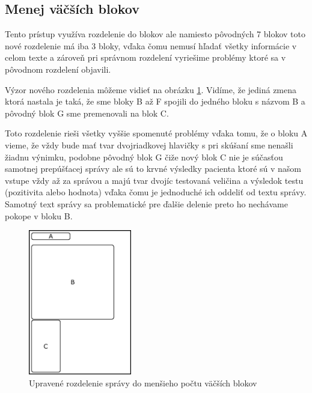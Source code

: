 \subsection{Menej väčších blokov}

Tento prístup využíva rozdelenie do blokov ale namiesto pôvodných 7 blokov toto nové rozdelenie má iba 3 bloky, vďaka čomu nemusí hľadať všetky informácie v celom texte a zároveň pri správnom rozdelení vyriešime problémy ktoré sa v pôvodnom rozdelení objavili. 

Výzor nového rozdelenia môžeme vidieť na obrázku \ref{obr:sprava_uprava}. Vidíme, že jediná zmena ktorá nastala je taká, že sme bloky B až F spojili do jedného bloku s názvom B a pôvodný blok G sme premenovali na blok C. 

Toto rozdelenie rieši všetky vyššie spomenuté problémy vďaka tomu, že o bloku A vieme, že vždy bude mať tvar dvojriadkovej hlavičky s pri skúšaní sme nenašli žiadnu výnimku, podobne pôvodný blok G čiže nový blok C nie je súčasťou samotnej prepúšťacej správy ale sú to krvné výsledky pacienta ktoré sú v našom vstupe vždy až za správou a majú tvar dvojíc testovaná veličina a výsledok testu (pozitivita alebo hodnota) vďaka čomu je jednoduché ich oddeliť od textu správy. Samotný text správy sa problematické pre ďalšie delenie preto ho nechávame pokope v bloku B.

\begin{figure}
	\centerline{\includegraphics[width=0.4\textwidth]{images/vyzor_spravy_vylepsena}}
	\caption[Upravené rozloženie správy]{Upravené rozdelenie správy do menšieho počtu väčších blokov}
	\label{obr:sprava_uprava}
\end{figure}
   